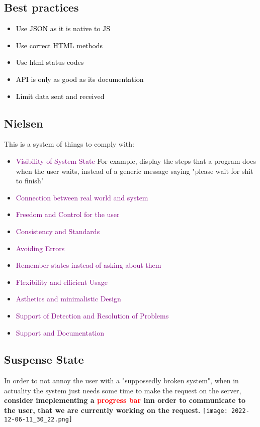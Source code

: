 \documentclass[main.tex,fontsize=6pt,paper=a4,paper=landscape,DIV=calc,]{scrartcl}
\begin{document}
\begin{multicols*}{4}
\subsection{Best practices}  
\begin{itemize}
\item \textcolor{black}{Use JSON as it is native to JS}
\item \textcolor{black}{Use correct HTML methods}
\item \textcolor{black}{Use html status codes}
\item \textcolor{black}{API is only as good as its documentation}
\item \textcolor{black}{Limit data sent and received}
\end{itemize} 

\subsection{Nielsen}  
This is a system of things to comply with:\newline
\begin{itemize}
\item \textcolor{purple}{Visibility of System State}\newline
  For example, display the steps that a program does when the user waits, instead of a generic message saying "please wait for shit to finish"
\item \textcolor{purple}{Connection between real world and system}
\item \textcolor{purple}{Freedom and Control for the user}
\item \textcolor{purple}{Consistency and Standards}
\item \textcolor{purple}{Avoiding Errors}
\item \textcolor{purple}{Remember states instead of asking about them}
\item \textcolor{purple}{Flexibility and efficient Usage}
\item \textcolor{purple}{Asthetics and minimalistic Design}
\item \textcolor{purple}{Support of Detection and Resolution of Problems}
\item \textcolor{purple}{Support and Documentation}
\end{itemize} 

\subsection{Suspense State} 
In order to not annoy the user with a "suppossedly broken system", when in actuality the system just needs some time to make the request on the server, \textbf{consider imeplementing a \textcolor{red}{progress bar} inn order to communicate to the user, that we are currently working on the request.}\newline
\texttt{[image: 2022-12-06-11\_30\_22.png]}


\end{multicols*}
\end{document}
